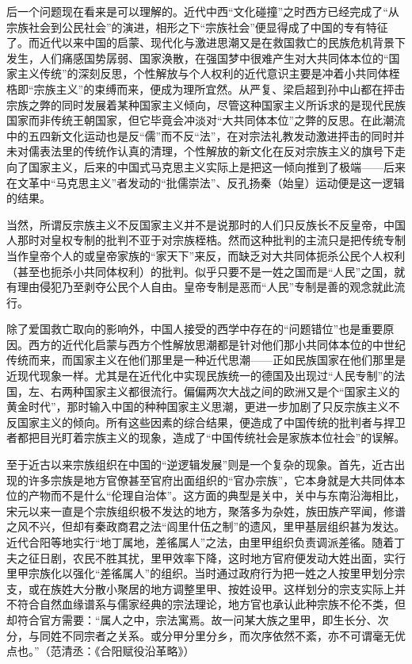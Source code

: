 \documentclass[a4paper,12pt,punct=kaiming,fontset=none]{ctexart}
\begin{document}
后一个问题现在看来是可以理解的。近代中西“文化碰撞”之时西方已经完成了“从宗族社会到公民社会”的演进，相形之下“宗族社会”便显得成了中国的专有特征了。而近代以来中国的启蒙、现代化与激进思潮又是在救国救亡的民族危机背景下发生，人们痛感国势孱弱、国家涣散，在强国梦中很难产生对大共同体本位的“国家主义传统”的深刻反思，个性解放与个人权利的近代意识主要是冲着小共同体桎梏即“宗族主义”的束缚而来，便成为理所宜然。从严复、梁启超到孙中山都在抨击宗族之弊的同时发展着某种国家主义倾向，尽管这种国家主义所诉求的是现代民族国家而非传统王朝国家，但它毕竟会冲淡对“大共同体本位”之弊的反思。在此潮流中的五四新文化运动也是反“儒”而不反“法”，在对宗法礼教发动激进抨击的同时并未对儒表法里的传统作认真的清理，个性解放的新文化在反对宗族主义的旗号下走向了国家主义，后来的中国式马克思主义实际上是把这一倾向推到了极端——后来在文革中“马克思主义”者发动的“批儒崇法”、反孔扬秦（始皇）运动便是这一逻辑的结果。

当然，所谓反宗族主义不反国家主义并不是说那时的人们只反族长不反皇帝，中国人那时对皇权专制的批判不亚于对宗族桎梏。然而这种批判的主流只是把传统专制当作皇帝个人的或皇帝家族的“家天下”来反，而缺乏对大共同体扼杀公民个人权利（甚至也扼杀小共同体权利）的批判。似乎只要不是一姓之国而是“人民”之国，就有理由侵犯乃至剥夺公民个人自由。皇帝专制是恶而“人民”专制是善的观念就此流行。

除了爱国救亡取向的影响外，中国人接受的西学中存在的“问题错位”也是重要原因。西方的近代化启蒙与西方个性解放思潮都是针对他们那小共同体本位的中世纪传统而来，而国家主义在他们那里是一种近代思潮——正如民族国家在他们那里是近现代现象一样。尤其是在近代化中实现民族统一的德国及出现过“人民专制”的法国，左、右两种国家主义都很流行。偏偏两次大战之间的欧洲又是个“国家主义的黄金时代”，那时输入中国的种种国家主义思潮，更进一步加剧了只反宗族主义不反国家主义的倾向。所有这些因素的综合结果，便造成了中国传统的批判者与捍卫者都把目光盯着宗族主义的现象，造成了“中国传统社会是家族本位社会”的误解。

至于近古以来宗族组织在中国的“逆逻辑发展”则是一个复杂的现象。首先，近古出现的许多宗族是地方官僚甚至官府出面组织的“官办宗族”，它本身就是大共同体本位的产物而不是什么“伦理自治体”。这方面的典型是关中，关中与东南沿海相比，宋元以来一直是个宗族组织极不发达的地方，聚落多为杂姓，族田族产罕闻，修谱之风不兴，但却有秦政商君之法“闾里什伍之制”的遗风，里甲基层组织甚为发达。近代合阳等地实行“地丁属地，差徭属人”之法，由里甲组织负责调派差徭。随着丁夫之征日剧，农民不胜其扰，里甲效率下降，这时地方官府便发动大姓出面，实行里甲宗族化以强化“差徭属人”的组织。当时通过政府行为把一姓之人按里甲划分宗支，或在族姓大分散小聚居的地方调整里甲、按姓设甲。这样划分的宗支实际上并不符合自然血缘谱系与儒家经典的宗法理论，地方官也承认此种宗族不伦不类，但却符合官方需要：“属人之中，宗法寓焉。故一问某大族之里甲，即生长分、次分，与同姓不同宗者之关系。或分甲分里分乡，而次序依然不紊，亦不可谓毫无优点也。”（范清丞：《合阳赋役沿革略》）
\end{document}
